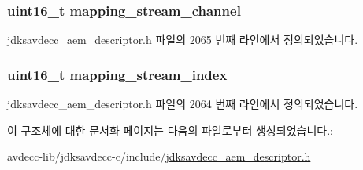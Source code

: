 \subsubsection[{\texorpdfstring{mapping\+\_\+stream\+\_\+channel}{mapping_stream_channel}}]{\setlength{\rightskip}{0pt plus 5cm}uint16\+\_\+t mapping\+\_\+stream\+\_\+channel}\hypertarget{structjdksavdecc__audio__mapping_a82e8b562c8e2249f302ed80fc1debadf}{}\label{structjdksavdecc__audio__mapping_a82e8b562c8e2249f302ed80fc1debadf}


jdksavdecc\+\_\+aem\+\_\+descriptor.\+h 파일의 2065 번째 라인에서 정의되었습니다.

\subsubsection[{\texorpdfstring{mapping\+\_\+stream\+\_\+index}{mapping_stream_index}}]{\setlength{\rightskip}{0pt plus 5cm}uint16\+\_\+t mapping\+\_\+stream\+\_\+index}\hypertarget{structjdksavdecc__audio__mapping_ae776f05f1f60f83a69c154844271ca4a}{}\label{structjdksavdecc__audio__mapping_ae776f05f1f60f83a69c154844271ca4a}


jdksavdecc\+\_\+aem\+\_\+descriptor.\+h 파일의 2064 번째 라인에서 정의되었습니다.



이 구조체에 대한 문서화 페이지는 다음의 파일로부터 생성되었습니다.\+:\begin{DoxyCompactItemize}
\item 
avdecc-\/lib/jdksavdecc-\/c/include/\hyperlink{jdksavdecc__aem__descriptor_8h}{jdksavdecc\+\_\+aem\+\_\+descriptor.\+h}\end{DoxyCompactItemize}
